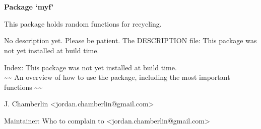 \documentclass[a4paper]{book}
\begin{document}
\chapter*{}
\begin{center}
{\textbf{\huge Package `myf'}}
\par\bigskip{\large \today}
\end{center}
\begin{description}
\raggedright{}
\item[Type]
\item[Title]
\item[Version]
\item[Date]
\item[Author]\AsIs{}
\item[Maintainer]\AsIs{}
\item[Description]
\item[License]
\end{description}
%
\begin{Description}\relax
This package holds random functions for recycling. 
\end{Description}
%
\begin{Details}\relax

No description yet. 
Please be patient. 
The DESCRIPTION file:
This package was not yet installed at build time.\\{}

Index:  This package was not yet installed at build time.\\{}
\textasciitilde{}\textasciitilde{} An overview of how to use the package, including the most important functions \textasciitilde{}\textasciitilde{}
\end{Details}
%
\begin{Author}\relax
J. Chamberlin <jordan.chamberlin@gmail.com>

Maintainer: Who to complain to <jordan.chamberlin@gmail.com>
\end{Author}
\end{document}
